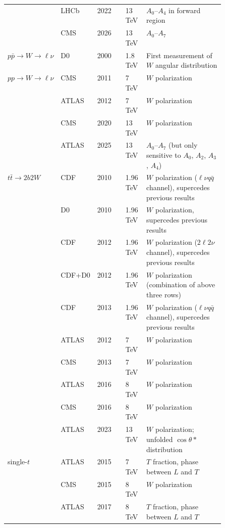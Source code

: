 \begin{landscape}
{\begin{longtable}{@{}lllll>{\raggedright\arraybackslash}p{0.5\linewidth}@{}}
        & LHCb & 2022 & \cite{LHCb:2022tbc} & 13\,TeV & $A_0$--$A_4$ in forward region \\
        & CMS & 2026 & \cite{CMS:2026amb} & 13\,TeV & $A_0$--$A_7$ \\
        \midrule
        $p\bar{p} \to W \to \ell\nu$ & D0 & 2000 & \cite{D0:2000ydn} & 1.8\,TeV & First measurement of $W$ angular distribution \\
        \midrule
        $pp \to W \to \ell\nu$ & CMS & 2011 & \cite{CMS:2011kaj} & 7\,TeV & $W$ polarization \\
        & ATLAS & 2012 & \cite{ATLAS:2012au} & 7\,TeV & $W$ polarization \\
        & CMS & 2020 & \cite{CMS:2020cph} & 13\,TeV & $W$ polarization \\
        & ATLAS & 2025 & \cite{ATLAS:2025mlt} & 13\,TeV & $A_0$--$A_7$ (but only sensitive to $A_0$, $A_2$, $A_3$, $A_4$) \\
        \midrule
        $t\bar{t} \to 2b2W $ & CDF & 2010 & \cite{CDF:2010cnn} & 1.96\,TeV & $W$ polarization ($\ell\nu q\bar{q}$ channel), supercedes previous results \\
        & D0 & 2010 & \cite{D0:2010zpi} & 1.96\,TeV & $W$ polarization, supercedes previous results \\
        & CDF & 2012 & \cite{CDF:2012odc} & 1.96\,TeV & $W$ polarization ($2\ell2\nu$ channel), supercedes previous results \\
        & CDF+D0 & 2012 & \cite{CDF:2012dup} & 1.96\,TeV & $W$ polarization (combination of above three rows)\\
        & CDF & 2013 & \cite{CDF:2012dbw} & 1.96\,TeV & $W$ polarization ($\ell\nu q\bar{q}$ channel), supercedes previous results \\
        & ATLAS & 2012 & \cite{ATLAS:2012nhi} & 7\,TeV & $W$ polarization \\
        & CMS & 2013 & \cite{CMS:2013xxb} & 7\,TeV & $W$ polarization \\
        & ATLAS & 2016 & \cite{ATLAS:2016fbc} & 8\,TeV & $W$ polarization \\
        & CMS & 2016 & \cite{CMS:2016asd} & 8\,TeV & $W$ polarization \\
        & ATLAS & 2023 & \cite{ATLAS:2022rms} & 13\,TeV & $W$ polarization; unfolded $\cos\theta*$ distribution \\
        \midrule
        single-$t$ & ATLAS & 2015 & \cite{ATLAS:2015ryj} & 7\,TeV & $T$ fraction, phase between $L$ and $T$ \\
        & CMS & 2015 & \cite{CMS:2014uod} & 8\,TeV & $W$ polarization \\
        & ATLAS & 2017 & \cite{ATLAS:2017rcx} & 8\,TeV & $T$ fraction, phase between $L$ and $T$ \\


\end{longtable}}
\end{landscape}
